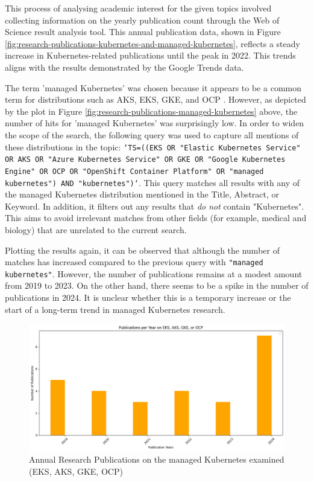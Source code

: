 This process of analysing academic interest for the given topics involved collecting information on the yearly publication count through the Web of Science result analysis tool. This annual publication data, shown in Figure \ref{fig:research-publications-kubernetes-and-managed-kubernetes}, reflects a steady increase in Kubernetes-related publications until the peak in 2022. This trends aligns with the results demonstrated by the Google Trends data.

The term 'managed Kubernetes' was chosen because it appears to be a common term for distributions such as AKS, EKS, GKE, and OCP \cite{AmazonEKSCustomers,ManagedKubernetesService,pereiraferreiraPerformanceEvaluationContainers2019}. However, as depicted by the plot in Figure \ref{fig:research-publications-managed-kubernetes} above, the number of hits for 'managed Kubernetes' was surprisingly low. In order to widen the scope of the search, the following query was used to capture all mentions of these distributions in the topic: \texttt{`TS=((EKS OR "Elastic Kubernetes Service" OR AKS OR "Azure Kubernetes Service" OR GKE OR "Google Kubernetes Engine" OR OCP OR "OpenShift Container Platform" OR "managed kubernetes") AND "kubernetes")`}. This query matches all results with any of the managed Kubernetes distribution mentioned in the Title, Abstract, or Keyword. In addition, it filters out any results that \textit{do not} contain "Kubernetes". This aims to avoid irrelevant matches from other fields (for example, medical and biology) that are unrelated to the current search.

Plotting the results again, it can be observed that although the number of matches has increased compared to the previous query with \texttt{"managed kubernetes"}. However, the number of publications remains at a modest amount from 2019 to 2023. On the other hand, there seems to be a spike in the number of publications in 2024. It is unclear whether this is a temporary increase or the start of a long-term trend in managed Kubernetes research.

\FloatBarrier


\begin{figure}
    \centering
    \includegraphics[width=1\linewidth]{resources/managed-k8s-broaden-scope.png}
    \caption{Annual Research Publications on the managed Kubernetes examined (EKS, AKS, GKE, OCP)}
    \label{fig:managed-k8s-broaden-scope}
\end{figure}


